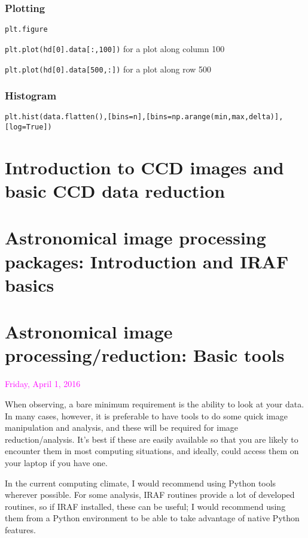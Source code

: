 \documentclass{article}
\begin{document}
\subsubsection*{Plotting}
\begin{itemize*}
    \item \texttt{plt.figure}
    \item \texttt{plt.plot(hd[0].data[:,100])} for a plot along column 100
    \item \texttt{plt.plot(hd[0].data[500,:])} for a plot along row 500
\end{itemize*}

\subsubsection*{Histogram}
\texttt{plt.hist(data.flatten(),[bins=n],[bins=np.arange(min,max,delta)],
[log=True])}

\section*{Introduction to CCD images and basic CCD data reduction}
\section*{Astronomical image processing packages: Introduction and IRAF basics}
\section*{Astronomical image processing/reduction: Basic tools}
\textcolor{magenta}{Friday, April 1, 2016}

When observing, a bare minimum requirement is the ability to look at
your data. In many cases, however, it is preferable to have tools to
do some quick image manipulation and analysis, and these will be
required for image reduction/analysis. It's best if these are easily
available so that you are likely to encounter them in most computing
situations, and ideally, could access them on your laptop if you have
one.

In the current computing climate, I would recommend using Python tools
wherever possible. For some analysis, IRAF routines provide a lot of
developed routines, so if IRAF installed, these can be useful; I would
recommend using them from a Python environment to be able to take
advantage of native Python features.
\end{document}
